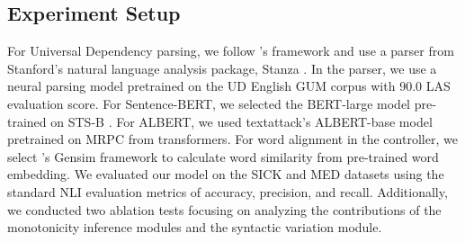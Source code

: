 \documentclass[11pt,a4paper]{article}
\begin{document}
\subsection{Experiment Setup}
For Universal Dependency parsing, we follow \citet{chengaoudep2mono}'s framework and use a parser from Stanford's natural language analysis package, Stanza \cite{qi-etal-2020-stanza}. In the parser, we use a neural parsing model pretrained on the UD English GUM corpus \cite{Zeldes2017} with 90.0 LAS \cite{zeman-etal-2018-conll} evaluation score. For Sentence-BERT, we selected the BERT-large model pre-trained on STS-B \cite{cer-etal-2017-semeval}. For ALBERT, we used textattack's ALBERT-base model pretrained on MRPC from transformers. For word alignment in the controller, we select \citet{rehurek_lrec}'s Gensim framework to calculate word similarity from pre-trained word embedding. 
We evaluated our model on the SICK and MED datasets using the standard NLI evaluation metrics of accuracy, precision, and recall. Additionally, we conducted two ablation tests focusing on analyzing the contributions of the monotonicity inference modules and the syntactic variation module. 

\begin{table}[t!]
\caption{Performance on the SICK test set  \label{tab:sick}}
\end{table}
\end{document}
